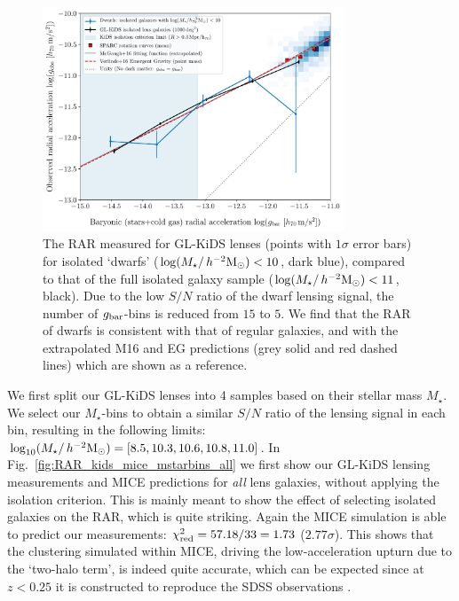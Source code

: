 \documentclass[usenatbib]{mnras}
\newcommand{\hmsun}{\,h^{-2} {\rm M_\odot}}
\newcommand{\un}[1]{_{\rm #1}}
\begin{document}
\begin{figure}
	\includegraphics[width=0.8\textwidth]{Figures/RAR_KiDS+dwarfs_Nobins_isolated.pdf}
	\caption{The RAR measured for GL-KiDS lenses (points with $1\sigma$ error bars) for isolated `dwarfs' ($\log(M_\star/\hmsun)<10$, dark blue), compared to that of the full isolated galaxy sample ($\log(M_\star/\hmsun) < 11$, black). Due to the low $S/N$ ratio of the dwarf lensing signal, the number of $g\un{bar}$-bins is reduced from $15$ to $5$. We find that the RAR of dwarfs is consistent with that of regular galaxies, and with the extrapolated M16 and EG predictions (grey solid and red dashed lines) which are shown as a reference.}
	\label{fig:RAR_kids_dwarfs}
\end{figure}

We first split our GL-KiDS lenses into 4 samples based on their stellar mass $M_\star$. We select our $M_\star$-bins to obtain a similar $S/N$ ratio of the lensing signal in each bin, resulting in the following limits: $\log_{10}(M_\star/\hmsun) = [8.5,10.3,10.6,10.8,11.0]$. In Fig.~\ref{fig:RAR_kids_mice_mstarbins_all} we first show our GL-KiDS lensing measurements and MICE predictions for \emph{all} lens galaxies, without applying the isolation criterion. This is mainly meant to show the effect of selecting isolated galaxies on the RAR, which is quite striking. Again the MICE simulation is able to predict our measurements: $\chi\un{red}^2 = 57.18 / 33 = 1.73$ ($2.77 \sigma$). This shows that the clustering simulated within MICE, driving the low-acceleration upturn due to the `two-halo term', is indeed quite accurate, which can be expected since at $z<0.25$ it is constructed to reproduce the SDSS observations \cite[]{zehavi2011}.
\end{document}
